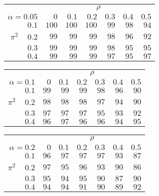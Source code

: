 \begin{tabular}{r|rrrrrr}
\hline\hline
 &\multicolumn{6}{c}{$\rho$} \\ 
 $\alpha = 0.05$ & $0$ & $0.1$ & $0.2$ & $0.3$ & $0.4$ & $0.5$ \\ 
 \hline$0.1$ & $100$ & $100$ & $100$ & $ 99$ & $ 98$ & $ 94$\\ 
$\pi^2\;\;\;$ $0.2$ & $ 99$ & $ 99$ & $ 99$ & $ 98$ & $ 96$ & $ 92$\\ 
$0.3$ & $ 99$ & $ 99$ & $ 99$ & $ 98$ & $ 95$ & $ 95$\\ 
$0.4$ & $ 99$ & $ 99$ & $ 99$ & $ 97$ & $ 95$ & $ 97$\\ 
 \hline 
 \end{tabular}
 
 \vspace{2em} 
 
\begin{tabular}{r|rrrrrr}
\hline\hline
 &\multicolumn{6}{c}{$\rho$} \\ 
 $\alpha = 0.1$ & $0$ & $0.1$ & $0.2$ & $0.3$ & $0.4$ & $0.5$ \\ 
 \hline$0.1$ & $99$ & $99$ & $99$ & $98$ & $96$ & $90$\\ 
$\pi^2\;\;\;$ $0.2$ & $98$ & $98$ & $98$ & $97$ & $94$ & $90$\\ 
$0.3$ & $97$ & $97$ & $97$ & $95$ & $93$ & $92$\\ 
$0.4$ & $96$ & $97$ & $96$ & $96$ & $94$ & $95$\\ 
 \hline 
 \end{tabular}
 
 \vspace{2em} 
 
\begin{tabular}{r|rrrrrr}
\hline\hline
 &\multicolumn{6}{c}{$\rho$} \\ 
 $\alpha = 0.2$ & $0$ & $0.1$ & $0.2$ & $0.3$ & $0.4$ & $0.5$ \\ 
 \hline$0.1$ & $96$ & $97$ & $97$ & $97$ & $93$ & $87$\\ 
$\pi^2\;\;\;$ $0.2$ & $97$ & $95$ & $96$ & $93$ & $90$ & $86$\\ 
$0.3$ & $95$ & $94$ & $95$ & $90$ & $87$ & $90$\\ 
$0.4$ & $94$ & $94$ & $91$ & $90$ & $89$ & $92$\\ 
 \hline 
 \end{tabular}